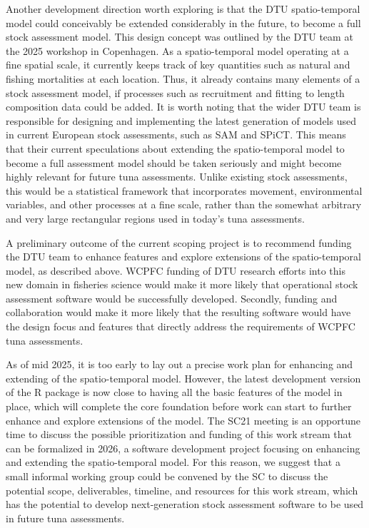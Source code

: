 \documentclass{SCreport}
\begin{document}
Another development direction worth exploring is that the DTU spatio-temporal
model could conceivably be extended considerably in the future, to become a full
stock assessment model. This design concept was outlined by the DTU team at the
2025 workshop in Copenhagen. As a spatio-temporal model operating at a fine
spatial scale, it currently keeps track of key quantities such as natural and
fishing mortalities at each location. Thus, it already contains many elements of
a stock assessment model, if processes such as recruitment and fitting to length
composition data could be added. It is worth noting that the wider DTU team is
responsible for designing and implementing the latest generation of models used
in current European stock assessments, such as SAM and SPiCT. This means that
their current speculations about extending the spatio-temporal model to become a
full assessment model should be taken seriously and might become highly relevant
for future tuna assessments. Unlike existing stock assessments, this would be a
statistical framework that incorporates movement, environmental variables, and
other processes at a fine scale, rather than the somewhat arbitrary and very
large rectangular regions used in today's tuna assessments.

A preliminary outcome of the current scoping project is to recommend funding the
DTU team to enhance features and explore extensions of the spatio-temporal
model, as described above. WCPFC funding of DTU research efforts into this new
domain in fisheries science would make it more likely that operational stock
assessment software would be successfully developed. Secondly, funding and
collaboration would make it more likely that the resulting software would have
the design focus and features that directly address the requirements of WCPFC
tuna assessments.

As of mid 2025, it is too early to lay out a precise work plan for enhancing and
extending of the spatio-temporal model. However, the latest development version
of the R package is now close to having all the basic features of the model in
place, which will complete the core foundation before work can start to further
enhance and explore extensions of the model. The SC21 meeting is an opportune
time to discuss the possible prioritization and funding of this work stream that
can be formalized in 2026, a software development project focusing on enhancing
and extending the spatio-temporal model. For this reason, we suggest that a
small informal working group could be convened by the SC to discuss the
potential scope, deliverables, timeline, and resources for this work stream,
which has the potential to develop next-generation stock assessment software to
be used in future tuna assessments.
\end{document}
